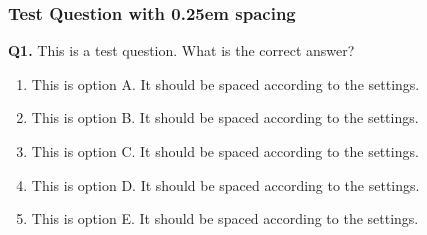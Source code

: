 \documentclass[
  letterpaper,
  DIV=11,
  numbers=noendperiod]{scrartcl}
\author{}
\date{}
\providecommand{\tightlist}{%
  \setlength{\itemsep}{0pt}\setlength{\parskip}{0pt}}
\def\tightlist{}
\begin{document}
\subsubsection{Test Question with 0.25em
spacing}\label{test-question-with-0.25em-spacing}

\textbf{Q1.} This is a test question. What is the correct answer?

\begin{enumerate}
\def\labelenumi{\alph{enumi}.}
\tightlist
\item
  This is option A. It should be spaced according to the settings.
\item
  This is option B. It should be spaced according to the settings.
\item
  This is option C. It should be spaced according to the settings.
\item
  This is option D. It should be spaced according to the settings.
\item
  This is option E. It should be spaced according to the settings.
\end{enumerate}
\end{document}
